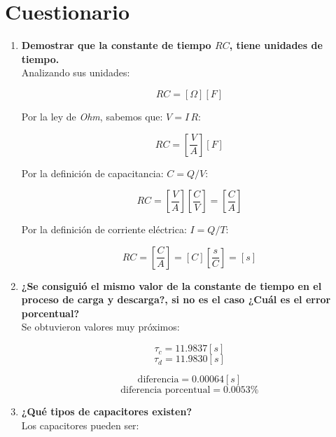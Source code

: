 \documentclass[letter,11pt]{article}
\begin{document}
\section{Cuestionario}
\begin{enumerate}
\item \textbf{Demostrar que la constante de tiempo $RC$, tiene unidades de
tiempo.} \\
Analizando sus unidades:

\begin{equation*}
    RC = [\Omega][F]
\end{equation*}

Por la ley de \emph{Ohm}, sabemos que: $V = I\,R$:

\begin{equation*}
    RC = \left[\frac{V}{A}\right][F]
\end{equation*}

Por la definición de capacitancia: $C = Q/V$:

\begin{equation*}
    RC = \left[\frac{V}{A}\right]\left[\frac{C}{V}\right] = \left[\frac{C}{A}\right]
\end{equation*}

Por la definición de corriente eléctrica: $I = Q/T$:

\begin{equation*}
    RC = \left[\frac{C}{A}\right] = [C]\left[\frac{s}{C}\right] = [s]
\end{equation*}

\item \textbf{¿Se consiguió el mismo valor de la constante de tiempo en el
proceso de carga y descarga?, si no es el caso ¿Cuál es el error porcentual?} \\
Se obtuvieron valores muy próximos:

\begin{equation*}
    \tau_c = 11.9837 [s]
\end{equation*}
\begin{equation*}
    \tau_d = 11.9830 [s]
\end{equation*}

\begin{equation*}
    \text{diferencia} = 0.00064 [s]
\end{equation*}
\begin{equation*}
    \text{diferencia porcentual} = 0.0053\%
\end{equation*}

\item \textbf{¿Qué tipos de capacitores existen?} \\
Los capacitores pueden ser:


\end{enumerate}
\end{document}
